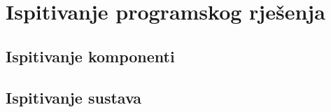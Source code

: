 			 
			\eject 
		
		\section{Ispitivanje programskog rješenja}
			
			
	
			
			\subsection{Ispitivanje komponenti}
			
			
			
			\subsection{Ispitivanje sustava}
			
			 
			
